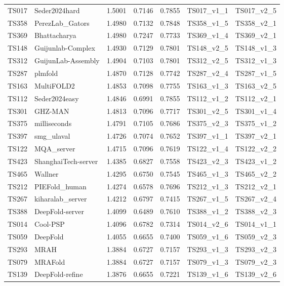 \begin{table}[ht]
{\begin{tabular}{llrrrll}
TS017 & Seder2024hard & 1.5001 & 0.7146 & 0.7855 & TS017\_v1\_1 & TS017\_v2\_5 \\ 
TS358 & PerezLab\_Gators & 1.4980 & 0.7132 & 0.7848 & TS358\_v1\_5 & TS358\_v2\_1 \\ 
TS369 & Bhattacharya & 1.4980 & 0.7247 & 0.7733 & TS369\_v1\_4 & TS369\_v2\_1 \\ 
TS148 & Guijunlab-Complex & 1.4930 & 0.7129 & 0.7801 & TS148\_v2\_5 & TS148\_v1\_3 \\ 
TS312 & GuijunLab-Assembly & 1.4904 & 0.7103 & 0.7801 & TS312\_v2\_5 & TS312\_v1\_3 \\ 
TS287 & plmfold & 1.4870 & 0.7128 & 0.7742 & TS287\_v2\_4 & TS287\_v1\_5 \\ 
TS163 & MultiFOLD2 & 1.4853 & 0.7098 & 0.7755 & TS163\_v1\_3 & TS163\_v2\_5 \\ 
TS112 & Seder2024easy & 1.4846 & 0.6991 & 0.7855 & TS112\_v1\_2 & TS112\_v2\_1 \\ 
TS301 & GHZ-MAN & 1.4813 & 0.7096 & 0.7717 & TS301\_v2\_5 & TS301\_v1\_4 \\ 
TS375 & milliseconds & 1.4791 & 0.7105 & 0.7686 & TS375\_v2\_3 & TS375\_v1\_2 \\ 
TS397 & smg\_ulaval & 1.4726 & 0.7074 & 0.7652 & TS397\_v1\_1 & TS397\_v2\_1 \\ 
TS122 & MQA\_server & 1.4715 & 0.7096 & 0.7619 & TS122\_v1\_4 & TS122\_v2\_2 \\ 
TS423 & ShanghaiTech-server & 1.4385 & 0.6827 & 0.7558 & TS423\_v2\_3 & TS423\_v1\_2 \\ 
TS465 & Wallner & 1.4295 & 0.6750 & 0.7545 & TS465\_v1\_3 & TS465\_v2\_2 \\ 
TS212 & PIEFold\_human & 1.4274 & 0.6578 & 0.7696 & TS212\_v1\_3 & TS212\_v2\_1 \\ 
TS267 & kiharalab\_server & 1.4212 & 0.6797 & 0.7415 & TS267\_v1\_5 & TS267\_v2\_4 \\ 
TS388 & DeepFold-server & 1.4099 & 0.6489 & 0.7610 & TS388\_v1\_2 & TS388\_v2\_3 \\ 
TS014 & Cool-PSP & 1.4096 & 0.6782 & 0.7314 & TS014\_v2\_6 & TS014\_v1\_1 \\ 
TS059 & DeepFold & 1.4055 & 0.6655 & 0.7400 & TS059\_v1\_6 & TS059\_v2\_3 \\ 
TS293 & MRAH & 1.3884 & 0.6727 & 0.7157 & TS293\_v1\_3 & TS293\_v2\_3 \\ 
TS079 & MRAFold & 1.3884 & 0.6727 & 0.7157 & TS079\_v1\_3 & TS079\_v2\_3 \\ 
TS139 & DeepFold-refine & 1.3876 & 0.6655 & 0.7221 & TS139\_v1\_6 & TS139\_v2\_6 \\ 

\end{tabular}}
\end{table}
